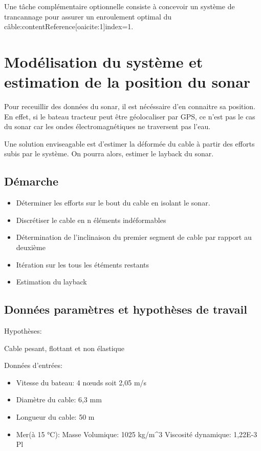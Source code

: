 \documentclass[12pt,a4paper]{article}
\begin{document}
Une tâche complémentaire optionnelle consiste à concevoir un système de trancannage pour assurer un enroulement
optimal du câble:contentReference[oaicite:1]{index=1}.




\section{Modélisation du système et estimation de la position du sonar}


Pour receuillir des données du sonar, il est nécéssaire d'en connaitre sa position. En effet, si le bateau tracteur
peut être géolocaliser par GPS, ce n'est pas le cas du sonar car les ondes électromagnétiques ne traversent pas l'eau.

Une solution enviseagable est d'estimer la déformée du cable à partir des efforts subis par le système.
On pourra alors, estimer le layback du sonar.

\subsection{Démarche}

\begin{itemize}

  \item Déterminer les efforts sur le bout du cable en isolant le sonar.
  \item Discrétiser le cable en n éléments indéformables
  \item Détermination de l'inclinaison du premier segment de cable par rapport au deuxième
  \item Itération sur les tous les étéments restants
  \item Estimation du layback


\end{itemize}


\subsection{Données paramètres et hypothèses de travail}

Hypothèses:
  \item  Cable pesant, flottant et non élastique

Données d'entrées:
\begin{itemize}
  \item Vitesse du bateau: 4 nœuds soit 2,05 m/s
  \item Diamètre du cable: 6,3 mm
  \item Longueur du cable: 50 m
  \item Mer(à 15 °C): Masse Volumique: 1025 kg/m^3    Viscosité dynamique: 1,22E-3 Pl
\end{itemize}
\end{document}
